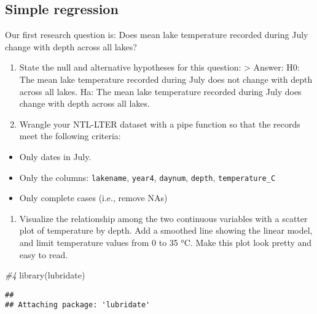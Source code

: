 \documentclass[
]{article}
\newenvironment{Shaded}{\begin{snugshade}}{\end{snugshade}}
\newcommand{\CommentTok}[1]{\textcolor[rgb]{0.56,0.35,0.01}{\textit{#1}}}
\newcommand{\FunctionTok}[1]{\textcolor[rgb]{0.00,0.00,0.00}{#1}}
\newcommand{\NormalTok}[1]{#1}
\providecommand{\tightlist}{%
  \setlength{\itemsep}{0pt}\setlength{\parskip}{0pt}}
\begin{document}
\hypertarget{simple-regression}{%
\subsection{Simple regression}\label{simple-regression}}

Our first research question is: Does mean lake temperature recorded
during July change with depth across all lakes?

\begin{enumerate}
\def\labelenumi{\arabic{enumi}.}
\setcounter{enumi}{2}
\item
  State the null and alternative hypotheses for this question:
  \textgreater{} Answer: H0: The mean lake temperature recorded during
  July does not change with depth across all lakes. Ha: The mean lake
  temperature recorded during July does change with depth across all
  lakes.
\item
  Wrangle your NTL-LTER dataset with a pipe function so that the records
  meet the following criteria:
\end{enumerate}

\begin{itemize}
\tightlist
\item
  Only dates in July.
\item
  Only the columns: \texttt{lakename}, \texttt{year4}, \texttt{daynum},
  \texttt{depth}, \texttt{temperature\_C}
\item
  Only complete cases (i.e., remove NAs)
\end{itemize}

\begin{enumerate}
\def\labelenumi{\arabic{enumi}.}
\setcounter{enumi}{4}
\tightlist
\item
  Visualize the relationship among the two continuous variables with a
  scatter plot of temperature by depth. Add a smoothed line showing the
  linear model, and limit temperature values from 0 to 35 °C. Make this
  plot look pretty and easy to read.
\end{enumerate}

\begin{Shaded}
\begin{Highlighting}[]
\CommentTok{\#4}
\FunctionTok{library}\NormalTok{(lubridate)}
\end{Highlighting}
\end{Shaded}

\begin{verbatim}
## 
## Attaching package: 'lubridate'
\end{verbatim}
\end{document}
